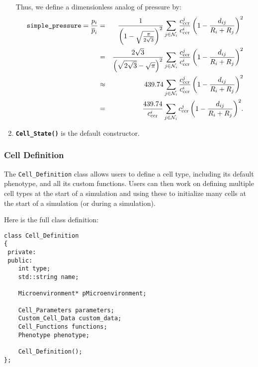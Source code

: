 \documentclass[12pt]{article}
\newcommand{\beqa}{\begin{eqnarray}}
\newcommand{\eeqa}{\end{eqnarray}}
\renewcommand{\v}{\verb}
\newcommand{\smallcode}[1]{\textbf{\texttt{#1}}}
\begin{document}
\begin{enumerate}
Thus, we define a dimensionless analog of pressure by: 
\beqa
\v|simple_pressure| = 
\frac{ p_i }{ \overline{p}_i }
 & = & 
 \frac{1}{ \left( 1 - \sqrt{\frac{\pi}{2\sqrt{3}}} \right)^2 }
\sum_{j \in \mathcal{N}_i}{ \frac{c^j_\mathrm{ccr}}{c^i_\mathrm{ccr}}
\left( 1 - \frac{d_{ij}}{R_i + R_j} \right)^2 
} \nonumber  \\
& = &
 \frac{2\sqrt{3}}{ \left( \sqrt{2\sqrt{3}} - \sqrt{\pi} \right)^2 }
\sum_{j \in \mathcal{N}_i}{  \frac{c^j_\mathrm{ccr}}{c^i_\mathrm{ccr}}
\left( 1 - \frac{d_{ij}}{R_i + R_j} \right)^2 
} \nonumber \\ 
& \approx &  
439.74 \sum_{j \in \mathcal{N}_i}{
  \frac{c^j_\mathrm{ccr}}{c^i_\mathrm{ccr}}
  \left( 1 - \frac{d_{ij}}{R_i + R_j} \right)^2 
} \nonumber \\
& = & 
\frac{439.74}{c^i_\mathrm{ccr}} \sum_{j \in \mathcal{N}_i}{
 {c^j_\mathrm{ccr}} \left( 1 - \frac{d_{ij}}{R_i + R_j} \right)^2 
} .
\eeqa

\item 
\smallcode{Cell\_State()} is the default constructor. 
\end{enumerate}

\subsubsection{Cell Definition}
\label{sec:Cell_Definition}
The \v|Cell_Definition| class allows users to define a 
cell type, including its default phenotype, and all its 
custom functions. Users can then work on defining 
multiple cell types at the start of a simulation 
and using these to initialize many cells at the start 
of a simulation (or during a simulation). 

Here is the full class definition: 
\begin{verbatim}
class Cell_Definition
{
 private:
 public: 
    int type; 
    std::string name; 
 
    Microenvironment* pMicroenvironment; 
    
    Cell_Parameters parameters; 
    Custom_Cell_Data custom_data; 
    Cell_Functions functions; 
    Phenotype phenotype; 

    Cell_Definition();   
};
\end{verbatim}
\end{document}
